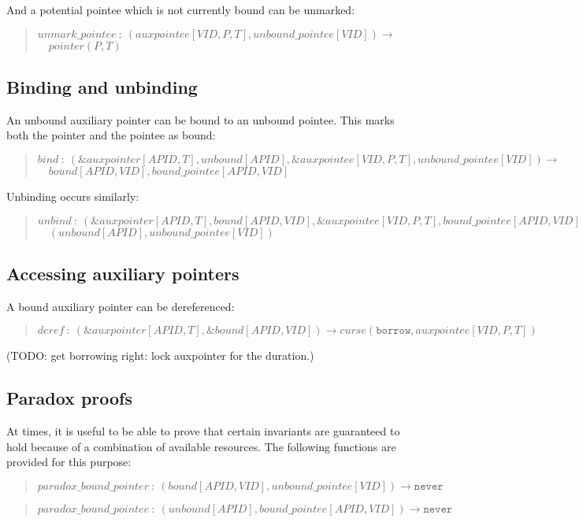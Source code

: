 \documentclass[a4paper]{book}
\newcommand\FuncSignature[2]{\begin{quote}$\mathit{#1}\ :\ \mathit{#2}$\end{quote}}
\newcommand\FuncSignatureII[3]{\begin{quote}$\mathit{#1}\ :\ \mathit{#2} \to$\\${}\quad \mathit{#3}$ \end{quote}}
\begin{document}
\noindent
And a potential pointee which is not currently bound can be unmarked:
\FuncSignatureII{unmark\_pointee}
{(auxpointee[VID,P,T], unbound\_pointee[VID])
}
{pointer(P,T)}

\subsection*{Binding and unbinding}
An unbound auxiliary pointer can be bound to an unbound pointee.
This marks both the pointer and the pointee as bound:

\FuncSignatureII{bind}
{(\&auxpointer[APID,T], unbound[APID], \&auxpointee[VID,P,T], unbound\_pointee[VID])}
{bound[APID,VID], bound\_pointee[APID,VID]}

\noindent
Unbinding occurs similarly:
\FuncSignatureII{unbind}
{(\&auxpointer[APID,T], bound[APID,VID], \&auxpointee[VID,P,T], bound\_pointee[APID,VID])}
{(unbound[APID], unbound\_pointee[VID])}

\subsection*{Accessing auxiliary pointers}

A bound auxiliary pointer can be dereferenced:

\FuncSignature{deref}{
  (\&auxpointer[APID,T], \&bound[APID,VID])
  \to
  curse(\mathtt{borrow}, auxpointee[VID,P,T])}

(TODO: get borrowing right: lock auxpointer for the duration.)



\subsection*{Paradox proofs}

At times, it is useful to be able to prove that certain invariants are
guaranteed to hold because of a combination of available resources.
The following functions are provided for this purpose:

\FuncSignature{paradox\_bound\_pointer}{
  (bound[APID,VID], unbound\_pointee[VID]) \to \mathtt{never}}
\FuncSignature{paradox\_bound\_pointee}{
  (unbound[APID], bound\_pointee[APID,VID]) \to \mathtt{never}}
\end{document}
